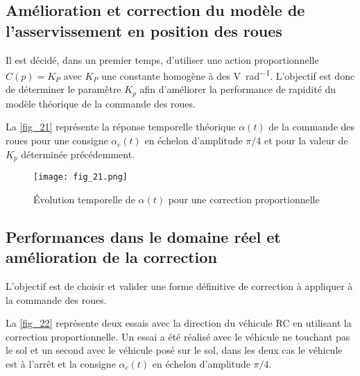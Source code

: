 \subsection{Amélioration et correction du modèle de l’asservissement en position des roues}
Il est décidé, dans un premier temps, d’utiliser une action proportionnelle $C(p)=K_P$ avec $K_P$ une constante
homogène à des \si{V.rad^{-1}}. L’objectif est donc de déterminer le paramètre $K_p$ afin d’améliorer la performance de rapidité du modèle théorique de la commande des roues.

\ifprof
\begin{corrige}
\end{corrige}
\else
\fi

La \autoref{fig_21} représente la réponse temporelle théorique $\alpha(t)$ de la commande des roues pour une consigne $\alpha_c(t)$ en échelon d’amplitude $\pi/4$ et pour la valeur de $K_p$ déterminée précédemment.


\begin{figure}[H]
\centering
\texttt{[image: fig\_21.png]}
\caption{Évolution temporelle de $\alpha(t)$ pour une correction proportionnelle \label{fig_21}}
\end{figure}

\ifprof
\begin{corrige}
\end{corrige}
\else
\fi

\subsection{Performances dans le domaine réel et amélioration de la correction}

\begin{obj}
L’objectif est de choisir et valider une forme définitive de correction à appliquer à la commande des
roues.
\end{obj}

La \autoref{fig_22} représente deux essais avec la direction du véhicule RC en utilisant la correction proportionnelle.
Un essai a été réalisé avec le véhicule ne touchant pas le sol et un second avec le véhicule posé sur le sol, dans
les deux cas le véhicule est à l’arrêt et la consigne $\alpha_c(t)$ en échelon d’amplitude $\pi/4$.

